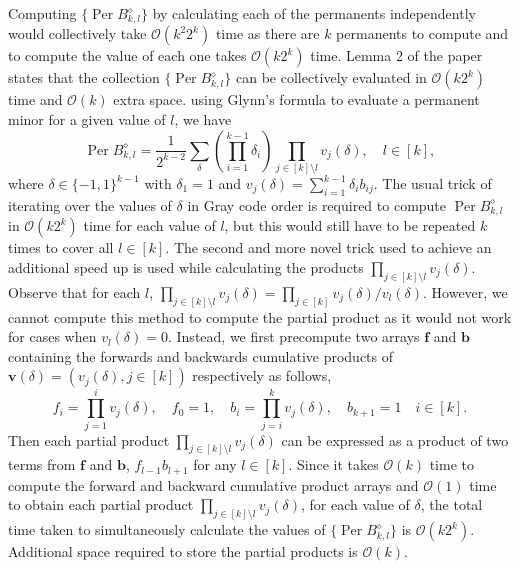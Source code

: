 \documentclass[11pt]{article}
\theoremstyle{theorem}
\theoremstyle{remark}
\theoremstyle{plain}
\theoremstyle{definition}
\DeclareMathOperator*{\Per}{\mathrm{Per}}
\begin{document}
Computing $\{ \Per B_{k, l}^{\diamond} \}$ by calculating each of the permanents independently would collectively take $\mathcal{O}(k^2 2^k)$ time as there are $k$ permanents to compute and to compute the value of each one takes $\mathcal{O}(k 2^k)$ time. Lemma 2 of the paper states that the collection $\{ \Per B_{k, l}^{\diamond} \}$ can be collectively evaluated in $\mathcal{O}(k 2^k)$ time and $\mathcal{O}(k)$ extra space. using Glynn's formula to evaluate a permanent minor for a given value of $l$, we have
\begin{equation}
\Per B_{k, l}^{\diamond} = \frac{1}{2^{k-2}} \sum_\delta \left( \prod_{i=1}^{k-1} \delta_i \right) \prod_{j \in [k] \setminus l} v_j (\delta), \quad l \in [k],
\end{equation}
where $\delta \in \{-1, 1\}^{k-1}$ with $\delta_1 = 1$ and $v_j (\delta) = \sum_{i=1}^{k-1} \delta_i b_{ij}$.
The usual trick of iterating over the values of $\delta$ in Gray code order is required to compute $\Per B_{k, l}^{\diamond}$ in $\mathcal{O}(k2^k)$ time for each value of $l$, but this would still have to be repeated $k$ times to cover all $l \in [k]$. The second and more novel trick used to achieve an additional speed up is used while calculating the products $\prod_{j \in [k] \setminus l} v_j (\delta)$. Observe that for each $l$, $\prod_{j \in [k] \setminus l} v_j (\delta) = \prod_{j \in [k]} v_j (\delta) / v_l(\delta)$. However, we cannot compute this method to compute the partial product as it would not work for cases when $v_l(\delta) = 0$. Instead, we first precompute two arrays $\mathbf{f}$ and $\mathbf{b}$ containing the forwards and backwards cumulative products of $\mathbf{v}(\delta) = (v_j(\delta), j\in [k])$ respectively as follows,
\begin{equation}
f_i = \prod_{j=1}^i v_j(\delta), \quad f_0 = 1,
\quad b_i = \prod_{j=i}^k v_j(\delta), \quad b_{k+1} = 1 \quad i \in [k].
\end{equation}
Then each partial product $\prod_{j \in [k] \setminus l} v_j (\delta)$ can be expressed as a product of two terms from $\mathbf{f}$ and $\mathbf{b}$, $f_{l-1} b_{l+1}$ for any $l \in [k]$. Since it takes $\mathcal{O}(k)$ time to compute the forward and backward cumulative product arrays and $\mathcal{O}(1)$ time to obtain each partial product $\prod_{j \in [k] \setminus l} v_j (\delta)$, for each value of $\delta$, the total time taken to simultaneously calculate the values of $\{ \Per B_{k, l}^{\diamond} \}$ is $\mathcal{O}(k2^k)$. Additional space required to store the partial products is $\mathcal{O}(k)$.
\end{document}
